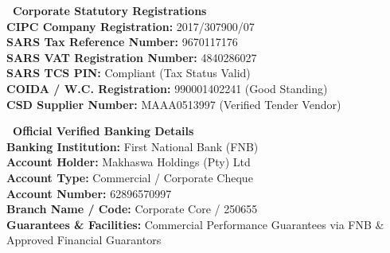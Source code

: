 \documentclass[a4paper,11pt]{article}
\begin{document}
\noindent
\begin{minipage}[t]{0.485\textwidth}
    \begin{tcolorbox}[enhanced, colback=white, colframe=mhlightgray, boxrule=0.8pt, arc=4pt, left=8pt, right=8pt, top=7pt, bottom=7pt, drop shadow=black!3]
        {\fontsize{8.5pt}{11pt}\selectfont\bfseries\color{mhnavy}\faFileContract\ Corporate Statutory Registrations}\\[3pt]
        {\fontsize{7.8pt}{11.0pt}\selectfont\color{mhtext}
        \textbf{CIPC Company Registration:} 2017/307900/07\\
        \textbf{SARS Tax Reference Number:} 9670117176\\
        \textbf{SARS VAT Registration Number:} 4840286027\\
        \textbf{SARS TCS PIN:} Compliant (Tax Status Valid)\\
        \textbf{COIDA / W.C. Registration:} 990001402241 (Good Standing)\\
        \textbf{CSD Supplier Number:} MAAA0513997 (Verified Tender Vendor)
        }
    \end{tcolorbox}
\end{minipage}
\hfill
\begin{minipage}[t]{0.485\textwidth}
    \begin{tcolorbox}[enhanced, colback=white, colframe=mhlightgray, boxrule=0.8pt, arc=4pt, left=8pt, right=8pt, top=7pt, bottom=7pt, drop shadow=black!3]
        {\fontsize{8.5pt}{11pt}\selectfont\bfseries\color{mhnavy}\faUniversity\ Official Verified Banking Details}\\[3pt]
        {\fontsize{7.8pt}{11.0pt}\selectfont\color{mhtext}
        \textbf{Banking Institution:} First National Bank (FNB)\\
        \textbf{Account Holder:} Makhaswa Holdings (Pty) Ltd\\
        \textbf{Account Type:} Commercial / Corporate Cheque\\
        \textbf{Account Number:} 62896570997\\
        \textbf{Branch Name / Code:} Corporate Core / 250655\\
        \textbf{Guarantees \& Facilities:} Commercial Performance Guarantees via FNB \& Approved Financial Guarantors
        }
    \end{tcolorbox}
\end{minipage}

\vfill
\end{document}
